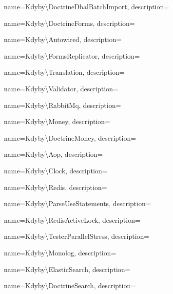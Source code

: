 {
  name={Kdy\-by\textbackslash{}Doc\-tri\-ne\-Dbal\-Batch\-Im\-port},
  description={} }

 {
  name={Kdy\-by\textbackslash{}Doc\-tri\-ne\-Forms},
  description={} }

 {
  name={Kdy\-by\textbackslash{}Auto\-wi\-red},
  description={} }

 {
  name={Kdy\-by\textbackslash{}Forms\-Re\-pli\-ca\-tor},
  description={} }

 {
  name={Kdy\-by\textbackslash{}Tran\-sla\-tion},
  description={} }

 {
  name={Kdy\-by\textbackslash{}Va\-li\-da\-tor},
  description={} }

 {
  name={Kdy\-by\textbackslash{}Ra\-bbit\-Mq},
  description={} }

 {
  name={Kdy\-by\textbackslash{}Mo\-ney},
  description={} }

 {
  name={Kdy\-by\textbackslash{}Doc\-tri\-ne\-Mo\-ney},
  description={} }

 {
  name={Kdy\-by\textbackslash{}Aop},
  description={} }

 {
  name={Kdy\-by\textbackslash{}Clo\-ck},
  description={} }

 {
  name={Kdy\-by\textbackslash{}Re\-di\-s},
  description={} }

 {
  name={Kdy\-by\textbackslash{}Par\-se\-Use\-Sta\-te\-men\-ts},
  description={} }

 {
  name={Kdy\-by\textbackslash{}Re\-dis\-Acti\-ve\-Lock},
  description={} }

 {
  name={Kdy\-by\textbackslash{}Tes\-ter\-Pa\-ra\-llel\-St\-ress},
  description={} }

 {
  name={Kdy\-by\textbackslash{}Mo\-no\-log},
  description={} }

 {
  name={Kdy\-by\textbackslash{}Elastic\-Sear\-ch},
  description={} }

 {
  name={Kdy\-by\textbackslash{}Doc\-tri\-ne\-Sear\-ch},
  description={} }

